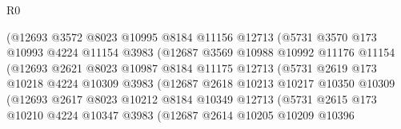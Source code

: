 \begin{lexlean}{R0}
\begin{coremodule}
                            (@12693
                              @3572
                              @8023
                              @10995
                              @8184
                              @11156
                              @12713
                              (@5731
                                @3570
                                @173
                                @10993
                                @4224
                                @11154
                                @3983
                                (@12687
                                  @3569
                                  @10988
                                  @10992
                                  @11176
                                  @11154
                                  (@12693
                                    @2621
                                    @8023
                                    @10987
                                    @8184
                                    @11175
                                    @12713
                                    (@5731
                                      @2619
                                      @173
                                      @10218
                                      @4224
                                      @10309
                                      @3983
                                      (@12687
                                        @2618
                                        @10213
                                        @10217
                                        @10350
                                        @10309
                                        (@12693
                                          @2617
                                          @8023
                                          @10212
                                          @8184
                                          @10349
                                          @12713
                                          (@5731
                                            @2615
                                            @173
                                            @10210
                                            @4224
                                            @10347
                                            @3983
                                            (@12687
                                              @2614
                                              @10205
                                              @10209
                                              @10396

\end{coremodule}
\end{lexlean}
